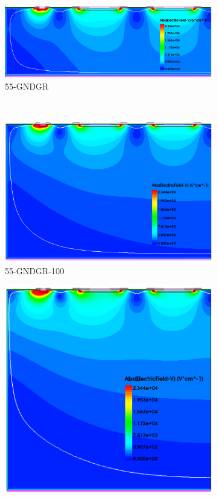 \begin{figure}[htbp]
\begin{subfigure}[b]{0.5\textwidth}
    \includegraphics[width=\textwidth]{figures/ActiveEdge/Efield_55_GNDGR.png}
    \caption{55-GNDGR}
  \end{subfigure} \\
  \begin{subfigure}[b]{0.5\textwidth}
    \includegraphics[width=\textwidth]{figures/ActiveEdge/Efield_55_GNDGR_100.png}
    \caption{55-GNDGR-100}
  \end{subfigure}\hfill
  \begin{subfigure}[b]{0.5\textwidth}
    \includegraphics[width=\textwidth]{figures/ActiveEdge/Efield_55_GNDGR_150.png}

\end{subfigure}
\end{figure}
